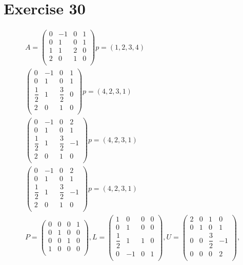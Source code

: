 \section{Exercise 30}
\begin{gather*}
A = 
\left( \begin{array}{cccc}
0 & -1 & 0 & 1\\
0 & 1 & 0 & 1\\
1 & 1 & 2  & 0\\
2 & 0 & 1 & 0\\
\end{array} \right) p = ( 1 , 2, 3, 4 )
\\
\left( \begin{array}{cccc}
0 & -1 & 0 & 1\\
0 & 1 & 0 & 1\\
\dfrac{1}{2} & 1 & \dfrac{3}{2}  & 0\\
2 & 0 & 1 & 0\\
\end{array} \right) p = ( 4, 2, 3, 1 ) 
\\
\left( \begin{array}{cccc}
0 & -1 & 0 & 2\\
0 & 1 & 0 & 1\\
\dfrac{1}{2} & 1 & \dfrac{3}{2}  & -1\\
2 & 0 & 1 & 0\\
\end{array} \right) p = ( 4, 2, 3, 1 ) 
\\
\left( \begin{array}{cccc}
0 & -1 & 0 & 2\\
0 & 1 & 0 & 1\\
\dfrac{1}{2} & 1 & \dfrac{3}{2}  & -1\\
2 & 0 & 1 & 0\\
\end{array} \right) p = ( 4, 2, 3, 1 ) 
\\
P = 
\left( \begin{array}{cccc}
0 & 0 & 0 & 1\\
0 & 1 & 0 & 0\\
0 & 0 & 1  & 0\\
1 & 0 & 0 & 0\\
\end{array} \right) , 
L =
\left( \begin{array}{cccc}
1 & 0 & 0 & 0\\
0 & 1 & 0 & 0\\
\dfrac{1}{2} & 1 & 1 & 0\\
0 & -1 & 0 & 1\\
\end{array} \right) , 
U = 
\left( \begin{array}{cccc}
2 & 0 & 1 & 0\\
0 & 1 & 0 & 1\\
0 & 0 & \dfrac{3}{2}  & -1\\
0 & 0 & 0 & 2\\
\end{array} \right) , 
\end{gather*}
